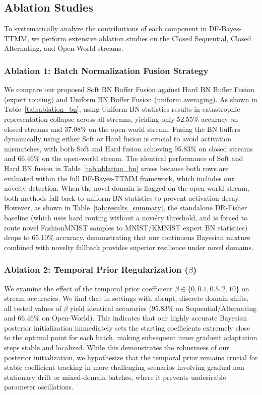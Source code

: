 \documentclass{article}
\theoremstyle{plain}
\theoremstyle{definition}
\theoremstyle{remark}
\begin{document}
\subsection{Ablation Studies}\vspace{-0.1in}
To systematically analyze the contributions of each component in DF-Bayes-TTMM, we perform
extensive ablation studies on the Closed Sequential, Closed Alternating, and Open-World streams.

\subsubsection{Ablation 1: Batch Normalization Fusion Strategy}\vspace{-0.1in}
We compare our proposed Soft BN Buffer Fusion against Hard BN Buffer Fusion (expert routing) and Uniform BN Buffer Fusion (uniform averaging).
As shown in Table~\ref{tab:ablation_bn}, using Uniform BN statistics results in catastrophic representation collapse across all streams, yielding only 52.55\% accuracy on closed streams and 37.08\% on the open-world stream. Fusing the BN buffers dynamically using either Soft or Hard fusion is crucial to avoid activation mismatches, with both Soft and Hard fusion achieving 95.83\% on closed streams and 66.46\% on the open-world stream.
The identical performance of Soft and Hard BN fusion in Table~\ref{tab:ablation_bn} arises because both rows are evaluated within the full DF-Bayes-TTMM framework, which includes our novelty detection. When the novel domain is flagged on the open-world stream, both methods fall back to uniform BN statistics to prevent activation decay. However, as shown in Table~\ref{tab:results_summary}, the standalone DR-Fisher baseline (which uses hard routing without a novelty threshold, and is forced to route novel FashionMNIST samples to MNIST/KMNIST expert BN statistics) drops to 65.10\% accuracy, demonstrating that our continuous Bayesian mixture combined with novelty fallback provides superior resilience under novel domains.

\subsubsection{Ablation 2: Temporal Prior Regularization ($\beta$)}\vspace{-0.1in}
We examine the effect of the temporal prior coefficient $\beta \in \{0, 0.1, 0.5, 2, 10\}$ on
stream accuracies. We find that in settings with abrupt, discrete domain shifts, all tested values of $\beta$ yield identical
accuracies (95.83\% on Sequential/Alternating and 66.46\% on Open-World). This indicates that our
highly accurate Bayesian posterior initialization immediately sets the starting coefficients
extremely close to the optimal point for each batch, making subsequent inner gradient adaptation
steps stable and localized. While this demonstrates the robustness of our posterior
initialization, we hypothesize that the temporal prior remains crucial for stable coefficient tracking in more challenging scenarios involving gradual non-stationary drift or mixed-domain batches, where it prevents undesirable parameter oscillations.
\end{document}

